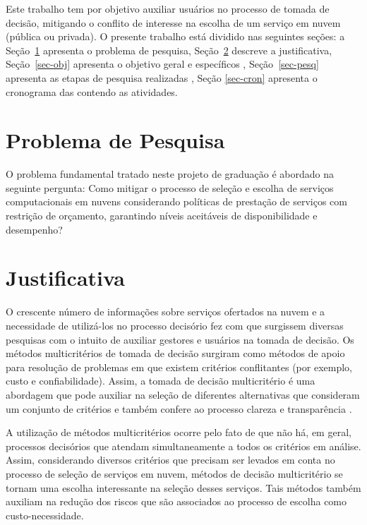 \documentclass[openany, a4paper,12pt, oneside]{article}
\begin{document}
Este trabalho tem por objetivo auxiliar usuários no processo de tomada de decisão, mitigando o conflito de interesse na escolha de um
serviço em nuvem (pública ou privada). O presente trabalho está dividido nas seguintes seções: a
Seção~\ref{sec-prob} apresenta o problema de pesquisa, Seção~\ref{sec-just} descreve a justificativa,
Seção~\ref{sec-obj} apresenta o objetivo geral e específicos , Seção~\ref{sec-pesq} apresenta as etapas de pesquisa realizadas , Seção \ref{sec-cron} apresenta o cronograma das contendo as atividades.

\section{Problema de Pesquisa}
\label{sec-prob}



O problema fundamental tratado neste projeto de graduação é abordado na seguinte pergunta: Como mitigar
o processo de seleção e escolha de serviços computacionais em nuvens considerando políticas de prestação de serviços
com restrição de orçamento, garantindo níveis aceitáveis de disponibilidade e desempenho?




\section{Justificativa}
\label{sec-just}

O crescente número de informações sobre serviços ofertados na nuvem e a necessidade de utilizá-los
no processo decisório fez com que surgissem diversas pesquisas com o intuito de auxiliar
gestores e usuários na tomada de decisão\cite{Saurabh,Whaiduzzaman,Alabool}.
Os métodos multicritérios de tomada de decisão surgiram como métodos de apoio para
resolução de problemas em que existem critérios conflitantes (por exemplo, custo e confiabilidade).
Assim, a tomada de decisão multicritério é uma abordagem que pode auxiliar na seleção de diferentes alternativas 
que consideram um conjunto de critérios e também confere ao processo clareza e transparência \cite{SABAEI, Kroenke}. 

A utilização de métodos multicritérios ocorre pelo fato de que não há, em geral, processos
decisórios que atendam simultaneamente a todos os critérios em análise. Assim, considerando
diversos critérios que precisam ser levados em conta no processo de seleção de serviços
em nuvem, métodos de decisão multicritério se tornam uma escolha interessante na seleção
desses serviços. Tais métodos também auxiliam na redução dos riscos que são associados ao processo
de escolha como custo-necessidade.
\end{document}
